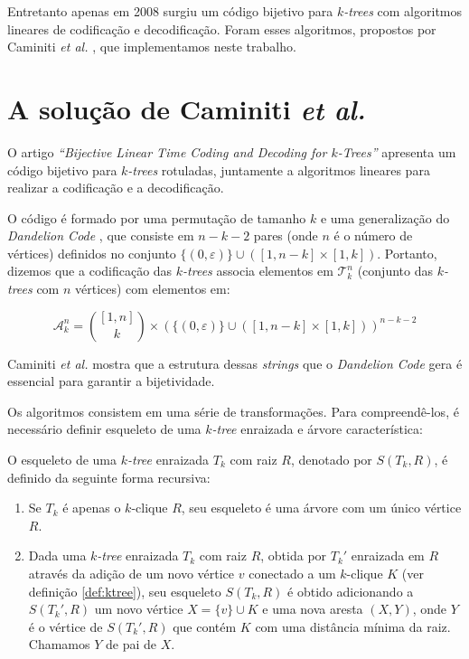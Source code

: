 Entretanto apenas em 2008 surgiu um código bijetivo para \emph{$k$-trees} com algoritmos lineares de codificação e decodificação. Foram esses algoritmos, propostos por Caminiti \emph{et al.} \cite{caminiti}, que implementamos neste trabalho.

\section{A solução de Caminiti \emph{et al.}}
\label{sec:caminiti}

O artigo \emph{``Bijective Linear Time Coding and Decoding for $k$-Trees''} \cite{caminiti} apresenta um código bijetivo para \emph{$k$-trees} rotuladas, juntamente a algoritmos lineares para realizar a codificação e a decodificação.

O código é formado por uma permutação de tamanho $k$ e uma generalização do \emph{Dandelion Code} \cite{egecioglu}, que consiste em $n-k-2$ pares (onde $n$ é o número de vértices) definidos no conjunto $\{ ( 0, \varepsilon ) \} \cup ([1,n-k] \times [1,k])$. Portanto, dizemos que a codificação das \emph{$k$-trees} associa elementos em $\mathcal{T}^n_k$ (conjunto das \emph{$k$-trees} com $n$ vértices) com elementos em:

$$
\mathcal{A}^n_k = { [1,n] \choose k } \times (\{ ( 0, \varepsilon ) \} \cup ([1,n-k] \times [1,k]))^{n-k-2}
$$

Caminiti \emph{et al.} \cite{caminiti} mostra que a estrutura dessas \emph{strings} que o \emph{Dandelion Code} gera é essencial para garantir a bijetividade.

\vspace{2em}

Os algoritmos consistem em uma série de transformações. Para compreendê-los, é necessário definir esqueleto de uma \emph{$k$-tree} enraizada e árvore característica:

\begin{definition}
  \label{def:skeleton}
  \cite{caminiti} O esqueleto de uma \emph{$k$-tree} enraizada $T_k$ com raiz $R$, denotado por $S(T_k, R)$, é definido da seguinte forma recursiva:

  \begin{enumerate}
    \item Se $T_k$ é apenas o $k$-clique $R$, seu esqueleto é uma árvore com um único vértice $R$.
    \item Dada uma \emph{$k$-tree} enraizada $T_k$ com raiz $R$, obtida por $T_k'$ enraizada em $R$ através da adição de um novo vértice $v$ conectado a um $k$-clique $K$ (ver definição \ref{def:ktree}), seu esqueleto $S(T_k, R)$ é obtido adicionando a $S(T_k', R)$ um novo vértice $X = \{v\} \cup K$ e uma nova aresta $(X, Y)$, onde $Y$ é o vértice de $S(T_k', R)$ que contém $K$ com uma distância mínima da raiz. Chamamos $Y$ de pai de $X$.
  \end{enumerate}
\end{definition}

